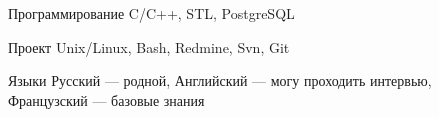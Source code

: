 

\begin{cvskills}

  \cvskill
    {Программирование} %
    {C/C++, STL, PostgreSQL} %

  \cvskill
    {Проект} %
    {Unix/Linux, Bash, Redmine, Svn, Git} %

  \cvskill
    {Языки} %
    {Русский — родной, Английский — могу проходить интервью, Французский — базовые знания} %

\end{cvskills}
